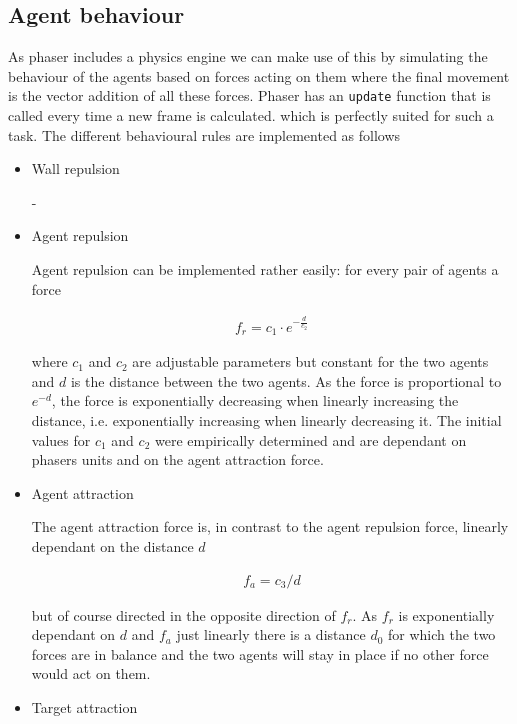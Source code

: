 \documentclass[11pt]{article}
\begin{document}
\subsection{Agent behaviour}

As phaser includes a physics engine we can make use of this by simulating the behaviour of the agents based on forces acting on them where the final movement is the vector addition of all these forces. Phaser has an \texttt{update} function that is called every time a new frame is calculated. which is perfectly suited for such a task. The different behavioural rules are implemented as follows

\begin{itemize}
    \item Wall repulsion
    
    -

    \item Agent repulsion
    
    Agent repulsion can be implemented rather easily: for every pair of agents a force
    
    \begin{align*}
    	f_r = c_1 \cdot e^{-\frac{d}{c_2}}
    \end{align*}
    
    where $c_1$ and $c_2$ are adjustable parameters but constant for the two agents and $d$ is the distance between the two agents. As the force is proportional to $e^{-d}$, the force is exponentially decreasing when linearly increasing the distance, i.e. exponentially increasing when linearly decreasing it. The initial values for $c_1$ and $c_2$ were empirically determined and are dependant on phasers units and on the agent attraction force.

    \item Agent attraction
    
    The agent attraction force is, in contrast to the agent repulsion force, linearly dependant on the distance $d$
    
    \begin{align*}
    	f_a = c_3 / d
    \end{align*}
    
    but of course directed in the opposite direction of $f_r$. As $f_r$ is exponentially dependant on $d$ and $f_a$ just linearly there is a distance $d_0$ for which the two forces are in balance and the two agents will stay in place if no other force would act on them.

    \item Target attraction
    

\end{itemize}
\end{document}
